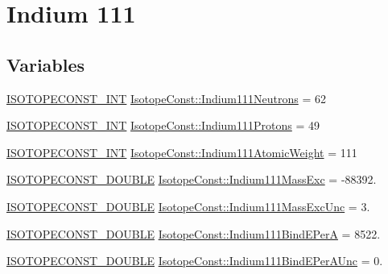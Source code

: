 \hypertarget{group___isotope_const-_indium-_in111}{}\section{Indium 111}
\label{group___isotope_const-_indium-_in111}
\subsection*{Variables}
\begin{DoxyCompactItemize}
\item 
\mbox{\hyperlink{group___isotope_const-_macros_ga5f18360b3e99483a35c32d789e62621c}{I\+S\+O\+T\+O\+P\+E\+C\+O\+N\+S\+T\+\_\+\+I\+NT}} \mbox{\hyperlink{group___isotope_const-_indium-_in111_gac832d0b2d3201b53579aa8f9f350426c}{Isotope\+Const\+::\+Indium111\+Neutrons}} = 62
\item 
\mbox{\hyperlink{group___isotope_const-_macros_ga5f18360b3e99483a35c32d789e62621c}{I\+S\+O\+T\+O\+P\+E\+C\+O\+N\+S\+T\+\_\+\+I\+NT}} \mbox{\hyperlink{group___isotope_const-_indium-_in111_ga18f1025b7e044a92ebd0d21c7ad6f178}{Isotope\+Const\+::\+Indium111\+Protons}} = 49
\item 
\mbox{\hyperlink{group___isotope_const-_macros_ga5f18360b3e99483a35c32d789e62621c}{I\+S\+O\+T\+O\+P\+E\+C\+O\+N\+S\+T\+\_\+\+I\+NT}} \mbox{\hyperlink{group___isotope_const-_indium-_in111_ga4fa71fd73e3407bbdec8f46c392579f2}{Isotope\+Const\+::\+Indium111\+Atomic\+Weight}} = 111
\item 
\mbox{\hyperlink{group___isotope_const-_macros_ga8f45a7272ce02c0b4c65c44636ed719a}{I\+S\+O\+T\+O\+P\+E\+C\+O\+N\+S\+T\+\_\+\+D\+O\+U\+B\+LE}} \mbox{\hyperlink{group___isotope_const-_indium-_in111_ga109a844256b30ddb5596103993dce46e}{Isotope\+Const\+::\+Indium111\+Mass\+Exc}} = -\/88392.
\item 
\mbox{\hyperlink{group___isotope_const-_macros_ga8f45a7272ce02c0b4c65c44636ed719a}{I\+S\+O\+T\+O\+P\+E\+C\+O\+N\+S\+T\+\_\+\+D\+O\+U\+B\+LE}} \mbox{\hyperlink{group___isotope_const-_indium-_in111_ga8a5b9075c971206a2f4aad014d811301}{Isotope\+Const\+::\+Indium111\+Mass\+Exc\+Unc}} = 3.
\item 
\mbox{\hyperlink{group___isotope_const-_macros_ga8f45a7272ce02c0b4c65c44636ed719a}{I\+S\+O\+T\+O\+P\+E\+C\+O\+N\+S\+T\+\_\+\+D\+O\+U\+B\+LE}} \mbox{\hyperlink{group___isotope_const-_indium-_in111_ga27595fed4bdffc24a60418c9b7b969eb}{Isotope\+Const\+::\+Indium111\+Bind\+E\+PerA}} = 8522.
\item 
\mbox{\hyperlink{group___isotope_const-_macros_ga8f45a7272ce02c0b4c65c44636ed719a}{I\+S\+O\+T\+O\+P\+E\+C\+O\+N\+S\+T\+\_\+\+D\+O\+U\+B\+LE}} \mbox{\hyperlink{group___isotope_const-_indium-_in111_gac0c170364e674949b2d1730ecacbb4c8}{Isotope\+Const\+::\+Indium111\+Bind\+E\+Per\+A\+Unc}} = 0.

\end{DoxyCompactItemize}
